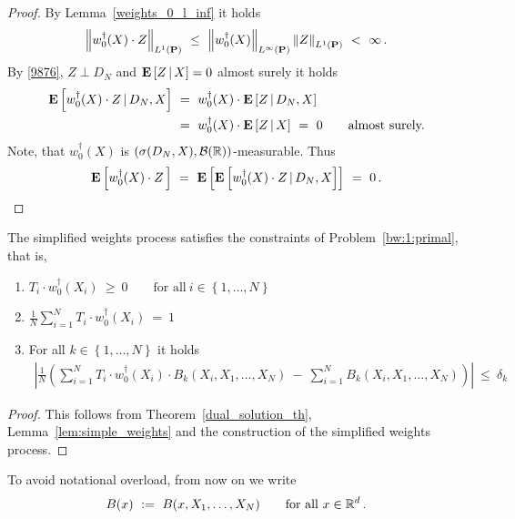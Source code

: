 \begin{proof}
  By Lemma~\ref{weights_0_l_inf} it holds
  \begin{gather}
    \label{9876}
    \norm{
  w_0^\dagger(X)\cdot Z
    }_{L^1(\P)}
    \ 
  \le
    \ 
  \norm{w_0^\dagger(X)}_{L^\infty(\P)}
  \norm{Z}_{L^1(\P)}
  \ 
  <
  \ 
  \infty
  \,.
  \end{gather}
  By 
  \eqref{9876},
  $Z\perp D_N$
  and
  $
\mathbf{E}
\left[
  Z
  \,
  |
  \, 
  X
\right]
= 0
  $
  almost surely
  it holds 
  \begin{align*}
    \E
  \left[
  w_0^\dagger(X)
  \cdot
  Z
  \,
  |
  \,
  D_N,X
  \right]
  &
  \ 
  =
  \ 
  w_0^\dagger(X)
  \cdot
  \E
  \left[
  Z
  \,
  |
  \,
  D_N,X
  \right]
  \\
  &
  \ 
  =
  \ 
  w_0^\dagger(X)
  \cdot
  \E
  \left[
  Z
  \,
  |
  \,
  X
  \right]
  \
  =
  \ 
  0
  \qquad
  \text{almost surely.}
  \end{align*}
  Note, that $w_0^\dagger(X)$ is 
  $
  \left(
  \sigma(D_N,X),\mathcal{B}(\mathbb{R})
  \right)
  $-measurable.  
  Thus
  \begin{gather*}
    \E
    \left[
  w_0^\dagger(X)
  \cdot
  Z
  \,
    \right]
    \ 
    =
    \ 
    \E
    \left[
 \E
  \left[
  w_0^\dagger(X)
  \cdot
  Z
  \,
  |
  \,
  D_N,X
  \right]
    \right]
    \ 
    =
    \ 
    0
    \,.
     \end{gather*}
\end{proof}

\begin{theorem}
  \label{th:weights_constr}
  The simplified weights process satisfies the constraints
  of Problem~\ref{bw:1:primal}, that is,
  \begin{enumerate}[label=(\roman*)]
    \item
      $
      T_i\cdot w_0^\dagger(X_i)
      \ 
      \ge
      \ 
      0
      \qquad
      \text{for all}\ 
      i\in  \left\{ 1,\ldots,N \right\}
      $
    \item
      $
      \frac{1}{N}
      \sum_{i=1}^{N} 
      T_i\cdot w_0^\dagger(X_i)
      \ 
      =
      \ 
      1
      $
    \item
      For all $k\in \left\{ 1,\ldots,N \right\}$
      it holds
      \begin{align*}
      \left| 
      \frac{1}{N}
      \left( 
        \sum_{i=1}^{N} 
      T_i\cdot w_0^\dagger(X_i)
      \cdot
        B_k(X_i,X_1,\ldots,X_N)
        \
        -
        \
        \sum_{i=1}^{N} 
        B_k(X_i,X_1,\ldots,X_N)
      \right)
      \right|
      \ 
      \le
      \ 
      \delta_k
      \end{align*}
  \end{enumerate}
\end{theorem}
\begin{proof}
  This follows from Theorem~\ref{dual_solution_th},
  Lemma~\ref{lem:simple_weights}
  and the construction of the simplified weights process.
\end{proof}
To avoid notational overload, from now on we write
\begin{align*}
  B(x)
  \ 
  :=
  \ 
  B(x,X_1,\ldots,X_N)
  \qquad
  \text{for all}\ 
  x\in\R^d
  \,.
\end{align*}
